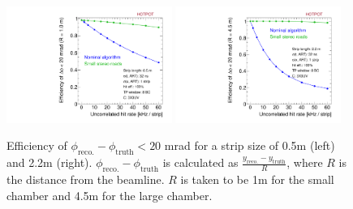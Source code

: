 \begin{figure}[!htpb]
  \begin{center}
    \includegraphics[width=0.48\textwidth]{figures/eff_phi_small_vs_rate.pdf}
    \includegraphics[width=0.48\textwidth]{figures/eff_phi_large_vs_rate.pdf}
  \end{center}
  \vspace{-10pt}
  \caption{Efficiency of $\phi_\text{reco.} - \phi_\text{truth} < 20$ mrad for a strip size of 0.5m (left) and 2.2m (right). $\phi_\text{reco.}-\phi_\text{truth}$ is calculated as $\frac{y_\text{reco.} - y_\text{truth}}{R}$, where $R$ is the distance from the beamline. $R$ is taken to be 1m for the small chamber and 4.5m for the large chamber.}
  \label{fig:eff_vs_rate}
\end{figure}

